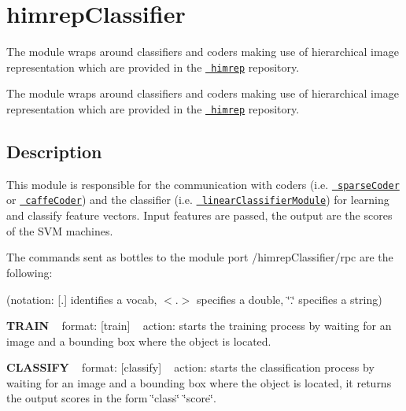\section{himrep\+Classifier}
\label{group__icub__himrepClassifier}


The module wraps around classifiers and coders making use of hierarchical image representation which are provided in the \href{https://github.com/robotology/himrep}{\texttt{ himrep}} repository.  


The module wraps around classifiers and coders making use of hierarchical image representation which are provided in the \href{https://github.com/robotology/himrep}{\texttt{ himrep}} repository. 

\hypertarget{group__iolReachingCalibration_intro_sec}{}\subsection{Description}\label{group__iolReachingCalibration_intro_sec}
This module is responsible for the communication with coders (i.\+e. \href{https://github.com/robotology/himrep/tree/master/modules/sparseCoder}{\texttt{ sparse\+Coder}} or \href{https://github.com/robotology/himrep/tree/master/modules/caffeCoder}{\texttt{ caffe\+Coder}}) and the classifier (i.\+e. \href{https://github.com/robotology/himrep/tree/master/modules/linearClassifierModule}{\texttt{ linear\+Classifier\+Module}}) for learning and classify feature vectors. Input features are passed, the output are the scores of the S\+VM machines.

The commands sent as bottles to the module port /himrep\+Classifier/rpc are the following\+:

(notation\+: \mbox{[}.\mbox{]} identifies a vocab, $<$.$>$ specifies a double, \char`\"{}.\char`\"{} specifies a string)

{\bfseries{T\+R\+A\+IN}} ~\newline
format\+: \mbox{[}train\mbox{]} ~\newline
action\+: starts the training process by waiting for an image and a bounding box where the object is located.

{\bfseries{C\+L\+A\+S\+S\+I\+FY}} ~\newline
format\+: \mbox{[}classify\mbox{]} ~\newline
action\+: starts the classification process by waiting for an image and a bounding box where the object is located, it returns the output scores in the form \char`\"{}class\char`\"{} \char`\"{}score\char`\"{}.

